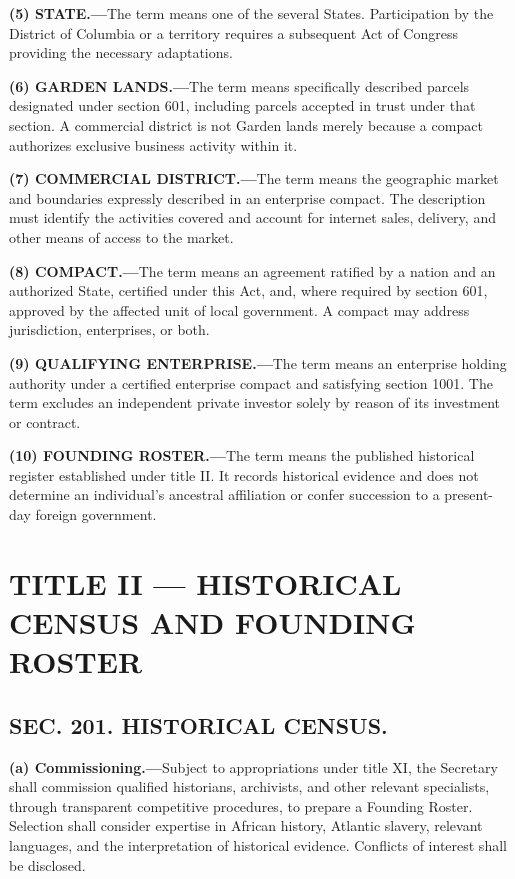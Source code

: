 \documentclass[12pt,letterpaper]{article}
\begin{document}
\textbf{(5) STATE.---}The term means one of the several States. Participation by the District of Columbia or a territory requires a subsequent Act of Congress providing the necessary adaptations.

\textbf{(6) GARDEN LANDS.---}The term means specifically described parcels designated under section 601, including parcels accepted in trust under that section. A commercial district is not Garden lands merely because a compact authorizes exclusive business activity within it.

\textbf{(7) COMMERCIAL DISTRICT.---}The term means the geographic market and boundaries expressly described in an enterprise compact. The description must identify the activities covered and account for internet sales, delivery, and other means of access to the market.

\textbf{(8) COMPACT.---}The term means an agreement ratified by a nation and an authorized State, certified under this Act, and, where required by section 601, approved by the affected unit of local government. A compact may address jurisdiction, enterprises, or both.

\textbf{(9) QUALIFYING ENTERPRISE.---}The term means an enterprise holding authority under a certified enterprise compact and satisfying section 1001. The term excludes an independent private investor solely by reason of its investment or contract.

\textbf{(10) FOUNDING ROSTER.---}The term means the published historical register established under title II. It records historical evidence and does not determine an individual's ancestral affiliation or confer succession to a present-day foreign government.

\section*{TITLE II --- HISTORICAL CENSUS AND FOUNDING ROSTER}

\subsection*{SEC. 201. HISTORICAL CENSUS.}

\textbf{(a) Commissioning.---}Subject to appropriations under title XI, the Secretary shall commission qualified historians, archivists, and other relevant specialists, through transparent competitive procedures, to prepare a Founding Roster. Selection shall consider expertise in African history, Atlantic slavery, relevant languages, and the interpretation of historical evidence. Conflicts of interest shall be disclosed.
\end{document}

